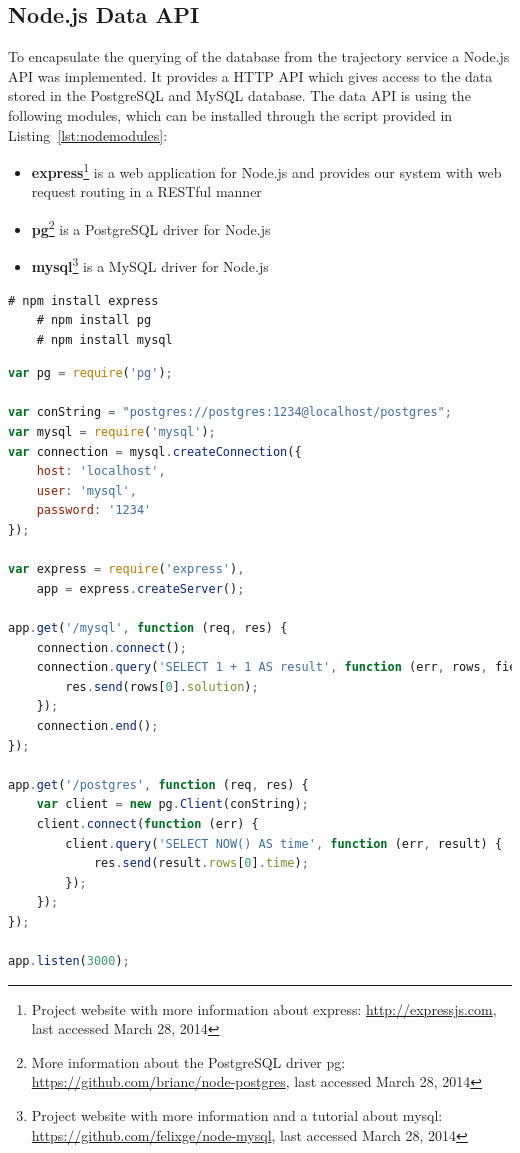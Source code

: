 \subsection{Node.js Data API}
To encapsulate the querying of the database from the trajectory service a Node.js API was implemented. It provides a HTTP API which gives access to the data stored in the PostgreSQL and MySQL database. The data API is using the following modules, which can be installed through the script provided in Listing~\ref{lst:nodemodules}:
\begin{itemize}
\item \textbf{express}\footnote{Project website with more information about express: \url{http://expressjs.com}, last accessed March 28, 2014} is a web application for Node.js and provides our system with web request routing in a RESTful manner
\item \textbf{pg}\footnote{More information about the PostgreSQL driver pg: \url{https://github.com/brianc/node-postgres}, last accessed March 28, 2014} is a PostgreSQL driver for Node.js
\item \textbf{mysql}\footnote{Project website with more information and a tutorial about mysql: \url{https://github.com/felixge/node-mysql}, last accessed March 28, 2014} is a MySQL driver for Node.js
\end{itemize}
\begin{lstlisting}[style=BashInputStyle,caption={Script to install the used Node.js modules},label={lst:nodemodules}]
    # npm install express
    # npm install pg
    # npm install mysql
\end{lstlisting}

\begin{lstlisting}[style=htmlcssjs,language=JavaScript,caption={Example for a Node.js app which is using the express framework and the PostgreSQL and MySQL module},label={lst:nodeexpress}]
var pg = require('pg');

var conString = "postgres://postgres:1234@localhost/postgres";
var mysql = require('mysql');
var connection = mysql.createConnection({
    host: 'localhost',
    user: 'mysql',
    password: '1234'
});

var express = require('express'),
    app = express.createServer();

app.get('/mysql', function (req, res) {
    connection.connect();
    connection.query('SELECT 1 + 1 AS result', function (err, rows, fields) {
        res.send(rows[0].solution);
    });
    connection.end();
});

app.get('/postgres', function (req, res) {
    var client = new pg.Client(conString);
    client.connect(function (err) {
        client.query('SELECT NOW() AS time', function (err, result) {
            res.send(result.rows[0].time);
        });
    });
});

app.listen(3000);
\end{lstlisting}

